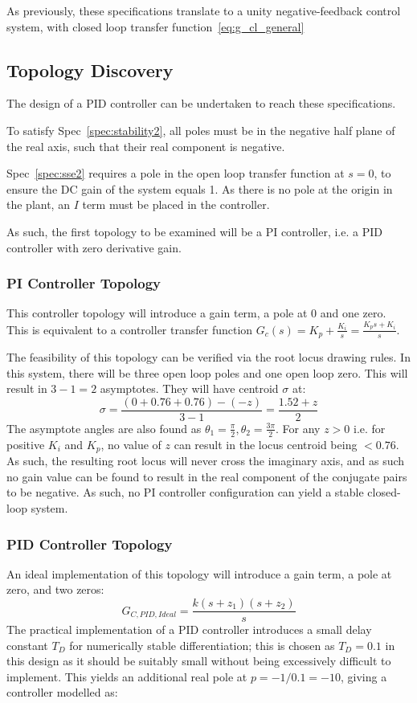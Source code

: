 \documentclass[conference,onecolumn,a4paper,11pt]{IEEEtran}
\begin{document}
As previously, these specifications translate to a unity negative-feedback control system, with closed loop transfer function~\eqref{eq:g_cl_general}
\subsection{Topology Discovery}
The design of a PID controller can be undertaken to reach these specifications. 

To satisfy Spec~\ref{spec:stability2}, all poles must be in the negative half plane of the real axis, such that their real component is negative. 

Spec~\ref{spec:sse2} requires a pole in the open loop transfer function at $s=0$, to ensure the DC gain of the system equals 1. As there is no pole at the origin in the plant, an $I$ term must be placed in the controller. 

As such, the first topology to be examined will be a PI controller, i.e. a PID controller with zero derivative gain.

\subsubsection{PI Controller Topology}

This controller topology will introduce a gain term, a pole at 0 and one zero. This is equivalent to a controller transfer function $G_c(s) = K_p + \frac{K_i}{s} = \frac{K_ps + K_i}{s}$. 

The feasibility of this topology can be verified via the root locus drawing rules. In this system, there will be three open loop poles and one open loop zero. This will result in $3 - 1 = 2$ asymptotes. They will have centroid $\sigma$ at:
$$
\sigma = \frac{(0+0.76+0.76)-(-z)}{3-1}
=\frac{1.52+z}{2}
$$
The asymptote angles are also found as $\theta_1 = \frac{\pi}{2}, \theta_2 = \frac{3\pi}{2}$. For any $z > 0$ i.e. for positive $K_i$ and $K_p$, no value of $z$ can result in the locus centroid being $< 0.76$. As such, the resulting root locus will never cross the imaginary axis, and as such no gain value can be found to result in the real component of the conjugate pairs to be negative. As such, no PI controller configuration can yield a stable closed-loop system.

\subsubsection{PID Controller Topology}
An ideal implementation of this topology will introduce a gain term, a pole at zero, and two zeros:
$$
G_{C, PID, Ideal} = \frac{k (s + z_1)(s + z_2)}{s}
$$
The practical implementation of a PID controller introduces a small delay constant $T_D$ for numerically stable differentiation; this is chosen as $T_D = 0.1$ in this design as it should be suitably small without being excessively difficult to implement. This yields an additional real pole at $p = -1/0.1 = -10$, giving a controller modelled as:
\end{document}
